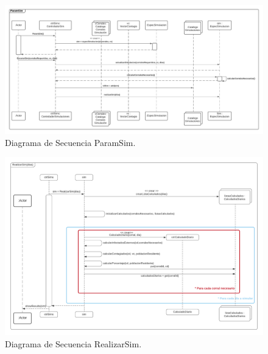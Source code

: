 \documentclass[a4paper]{article}
\begin{document}
\begin{figure}[H]
	\centering
	\includegraphics[width=1\linewidth]{graphics/41-DS.pdf}
	\caption{Diagrama de Secuencia ParamSim.}
\end{figure}

\begin{figure}[H]
	\centering
	\includegraphics[width=1\linewidth]{graphics/42-DS.pdf}
	\caption{Diagrama de Secuencia RealizarSim.}
\end{figure}
\end{document}
